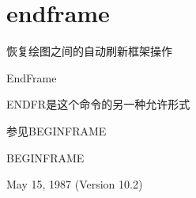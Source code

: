 \section{endframe}
\label{cmd:endframe}

恢复绘图之间的自动刷新框架操作

EndFrame

ENDFR是这个命令的另一种允许形式

参见BEGINFRAME

BEGINFRAME

May 15, 1987 (Version 10.2)
